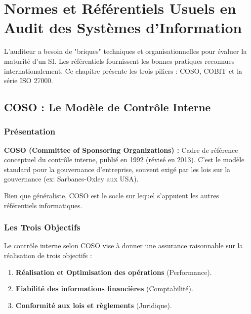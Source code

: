 
\chapter{Normes et Référentiels Usuels en Audit des Systèmes d'Information}\label{chap:04_referentiels}

L'auditeur a besoin de "briques" techniques et organisationnelles pour évaluer la maturité d'un SI. Les référentiels fournissent les bonnes pratiques reconnues internationalement. Ce chapitre présente les trois piliers : COSO, COBIT et la série ISO 27000.

\section{COSO : Le Modèle de Contrôle Interne}

\subsection{Présentation}

\begin{boxdef}
\textbf{COSO (Committee of Sponsoring Organizations) :} Cadre de référence conceptuel du contrôle interne, publié en 1992 (révisé en 2013). C'est le modèle standard pour la gouvernance d'entreprise, souvent exigé par les lois sur la gouvernance (ex: Sarbanes-Oxley aux USA).
\end{boxdef}

Bien que généraliste, COSO est le socle sur lequel s'appuient les autres référentiels informatiques.

\subsection{Les Trois Objectifs}

Le contrôle interne selon COSO vise à donner une assurance raisonnable sur la réalisation de trois objectifs :
\begin{enumerate}
    \item \textbf{Réalisation et Optimisation des opérations} (Performance).
    \item \textbf{Fiabilité des informations financières} (Comptabilité).
    \item \textbf{Conformité aux lois et règlements} (Juridique).
\end{enumerate}

